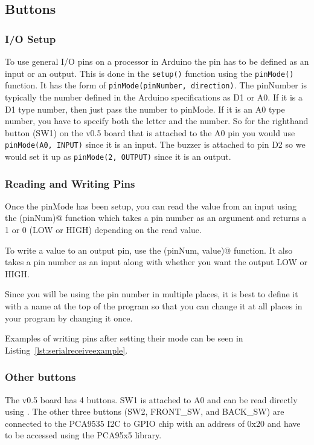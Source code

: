 \subsection{Buttons}
\subsubsection{I/O Setup}
To use general I/O pins on a processor in Arduino the pin has to be defined as an 
input or an output. This is done in the \lstinline$setup()$ function using the 
\lstinline$pinMode()$ function. It has the form of 
\lstinline$pinMode(pinNumber, direction)$. The pinNumber is typically the number 
defined in the Arduino specifications as D1 or A0. If it is a D1 type number, then
just pass the number to pinMode. If it is an A0 type number, you have to specify 
both the letter and the number. So for the righthand button (SW1) on the v0.5 board 
that is attached to the A0 pin you would use \lstinline$pinMode(A0, INPUT)$ since
it is an input. The buzzer is attached to pin D2 so we would set it up as 
\lstinline$pinMode(2, OUTPUT)$ since it is an output. 

\subsubsection{Reading and Writing Pins}
Once the pinMode has been setup, you can read the value from an input using the 
\lstinline@digitalRead(pinNum)@ function which takes a pin number as an argument
and returns a 1 or 0 (LOW or HIGH) depending on the read value.

To write a value to an output pin, use the \lstinline@digitalWrite(pinNum, value)@ 
function. It also takes a pin number as an input along with whether you want the 
output LOW or HIGH. 

Since you will be using the pin number in multiple places, it is best to define it 
with a name at the top of the program so that you can change it at all places in 
your program by changing it once.

Examples of writing pins after setting their mode can be seen in 
Listing~\ref{lst:serialreceiveexample}.

\subsubsection{Other buttons}
The v0.5 board has 4 buttons. SW1 is attached to A0 and can be read directly using
\lstinline@digitalRead@. The other three buttons (SW2, FRONT\_SW, and BACK\_SW) are 
connected to the PCA9535 I2C to GPIO chip with an address of 0x20 and have to be 
accessed using the PCA95x5 library. 

